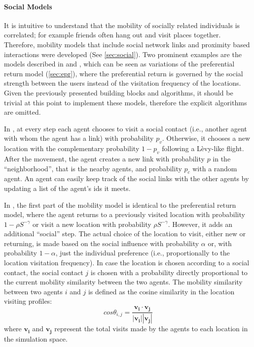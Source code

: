 \paragraph{Social Models}

It is intuitive to understand that the mobility of socially related individuals is correlated; for example friends often hang out and visit places together. Therefore, mobility models that include social network links and proximity based interactions were developed (See \sectionname\ref{sec:social}). Two prominent examples are the models described in \cite{grabowicz_2014_entangling} and \cite{toole_2015_coupling}, which can be seen as variations of the preferential return model (\sectionname\ref{sec:epr}), where the preferential return is governed by the social strength between the users instead of the visitation frequency of the locations. Given the previously presented building blocks and algorithms, it should be trivial at this point to implement these models, therefore the explicit algorithms are omitted.

In \cite{grabowicz_2014_entangling}, at every step each agent chooses to visit a social contact (i.e., another agent with whom the agent has a link) with probability $p_v$. Otherwise, it chooses a new location with the complementary probability $1 - p_v$ following a L\`evy-like flight. After the movement, the agent creates a new link with probability $p$ in the ``neighborhood'', that is the nearby agents, and probability $p_c$ with a random agent. An agent can easily keep track of the social links with the other agents by updating a list of the agent's ids it meets. 

In \cite{toole_2015_coupling}, the first part of the mobility model is identical to the preferential return model, where the agent returns to a previously visited location with probability $1 - \rho S^{-\gamma}$ or visit a new location with probability $\rho S^{-\gamma}$. However, it adds an additional ``social'' step. The actual choice of the location to visit, either new or returning, is made based on the social influence with probability $\alpha$ or, with probability $1 - \alpha$, just the individual preference (i.e., proportionally to the location visitation frequency). In case the location is chosen according to a social contact, the social contact $j$ is chosen with a probability directly proportional to the current mobility similarity between the two agents. The mobility similarity between two agents $i$ and $j$ is defined as the cosine similarity in the location visiting profiles:
\begin{displaymath}
cos \theta_{i,j} = \frac{\mathbf{v_i}\cdot\mathbf{v_j}}{|\mathbf{v_i}||\mathbf{v_j}|}
\end{displaymath}
where $\mathbf{v_i}$ and $\mathbf{v_j}$ represent the total visits made by the agents to each location in the simulation space.

